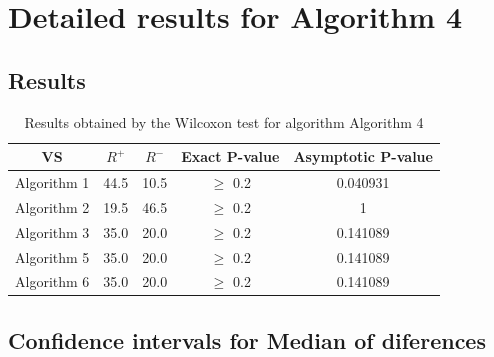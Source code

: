 \documentclass[a4paper,10pt]{article}
\begin{document}
 \clearpage 


\section{Detailed results for Algorithm 4}


\subsection{Results}

\begin{table}[!htp]
\centering\small
\begin{tabular}{
|c|c|c|c|c|}
\hline
 VS & $R^{+}$ & $R^{-}$ & Exact P-value & Asymptotic P-value \\ \hline 
Algorithm 1 & 44.5 & 10.5 & $\geq$ 0.2 & 0.040931\\ \hline 
Algorithm 2 & 19.5 & 46.5 & $\geq$ 0.2 & 1\\ \hline 
Algorithm 3 & 35.0 & 20.0 & $\geq$ 0.2 & 0.141089\\ \hline 
Algorithm 5 & 35.0 & 20.0 & $\geq$ 0.2 & 0.141089\\ \hline 
Algorithm 6 & 35.0 & 20.0 & $\geq$ 0.2 & 0.141089\\ \hline 

\end{tabular}
\caption{Results obtained by the Wilcoxon test for algorithm Algorithm 4}
\end{table}

\subsection{Confidence intervals for Median of diferences}
\end{document}
